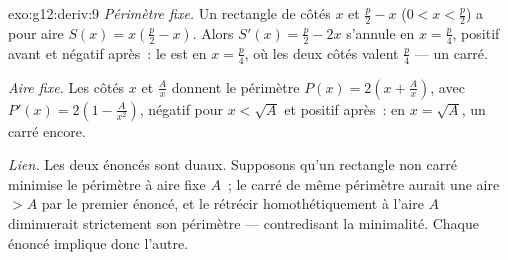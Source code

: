 \begin{solution}{exo:g12:deriv:9}
\emph{Périmètre fixe.} Un rectangle de côtés $x$ et $\frac{p}{2} - x$
($0 < x < \frac p2$) a pour aire $S(x) = x\left(\frac p2 - x\right)$.
Alors $S'(x) = \frac p2 - 2x$ s'annule en $x = \frac p4$, positif avant
et négatif après~: le  est en $x = \frac{p}{4}$, où les deux
côtés valent $\frac p4$ --- un carré.

\emph{Aire fixe.} Les côtés $x$ et $\frac Ax$ donnent le périmètre
$P(x) = 2\left(x + \frac Ax\right)$, avec
$P'(x) = 2\left(1 - \frac{A}{x^2}\right)$, négatif pour $x < \sqrt A$ et
positif après~:  en $x = \sqrt{A}$, un carré encore.

\emph{Lien.} Les deux énoncés sont duaux. Supposons qu'un rectangle non
carré minimise le périmètre à aire fixe $A$~; le carré de même périmètre
aurait une aire $> A$ par le premier énoncé, et le rétrécir
homothétiquement à l'aire $A$ diminuerait strictement son périmètre ---
contredisant la minimalité. Chaque énoncé implique donc l'autre.
\end{solution}

